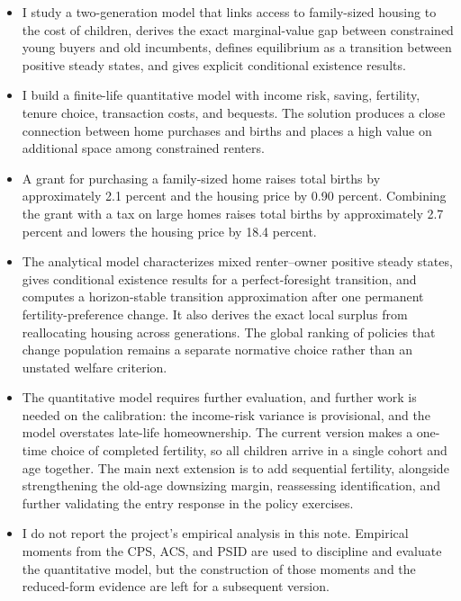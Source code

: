 \documentclass[11pt]{article}
\theoremstyle{definition}
\newcommand{\1}{\mathbf 1}
\begin{document}
\begin{itemize}
\item I study a two-generation model that links access to family-sized housing
to the cost of children, derives the exact marginal-value gap between
constrained young buyers and old incumbents, defines equilibrium as a transition
between positive steady states, and gives explicit conditional existence
results.
\item I build a finite-life quantitative model with income risk, saving,
fertility, tenure choice, transaction costs, and bequests. The solution
produces a close connection between home purchases and births and
places a high value on additional space among constrained renters.
\item A grant for purchasing a family-sized home raises total births by
approximately 2.1 percent and the housing price by 0.90 percent. Combining the
grant with a tax on large homes raises total births by approximately 2.7
percent and lowers the housing price by 18.4 percent.
\item The analytical model characterizes mixed renter--owner positive steady
states, gives conditional existence results for a perfect-foresight transition,
and computes a horizon-stable transition approximation after one permanent
fertility-preference change. It also derives the exact local surplus from
reallocating housing across generations. The global ranking of policies that
change population remains a separate normative choice rather than an unstated
welfare criterion.
\item The quantitative model requires further evaluation, and further work is
needed on the calibration: the income-risk variance is provisional, and the
model overstates late-life homeownership. The
current version makes a one-time choice of completed fertility, so all children
arrive in a single cohort and age together. The main next extension is to add
sequential fertility, alongside strengthening the old-age downsizing margin,
reassessing identification, and further validating the entry response in the
policy exercises.
\item I do not report the project's empirical analysis in this note. Empirical
moments from the CPS, ACS, and PSID are used to discipline and evaluate the
quantitative model, but the construction of those moments and the reduced-form
evidence are left for a subsequent version.
\end{itemize}
\end{document}
